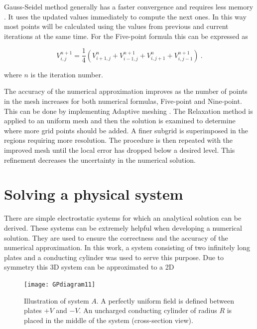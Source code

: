 \documentclass[a4paper]{jpconf}
\begin{document}
Gauss-Seidel method generally has a faster convergence and requires less memory \cite{Cheney.Kincai-NumericalMethods}. It uses the updated values immediately to compute the next ones. In this way most points will be calculated using the values from previous and current iterations at the same time. For the Five-point formula this can be expressed as

\begin{equation}
V_{i,j}^{n+1} = \frac{1}{4}(V_{i+1,j}^{n} + V_{i-1,j}^{n+1} + V_{i,j+1}^{n} + V_{i,j-1}^{n+1})~.
\end{equation}

\noindent where $n$ is the iteration number. 

The accuracy of the numerical approximation improves as the number of points in the mesh increases for both numerical formulas, Five-point and Nine-point. This can be done by implementing Adaptive meshing \cite{Press.T.V.F-NumericalRecipes}. The Relaxation method is applied to an uniform mesh and then the solution is examined to determine where more grid points should be added. A finer subgrid is superimposed in the regions requiring more resolution. The procedure is then repeated with the improved mesh until the local error has dropped below a desired level. This refinement decreases the uncertainty in the numerical solution.


\section*{Solving a physical system}
There are simple electrostatic systems for which an analytical solution can be derived. These systems can be extremely helpful when developing a numerical solution. They are used to ensure the correctness and the accuracy of the numerical approximation. In this work, a system consisting of two infinitely long plates and a conducting cylinder was used to serve this purpose. Due to symmetry this 3D system can be approximated to a 2D 



\begin{figure}[h]
	\centering
	\texttt{[image: GPdiagram11]} 
	\caption{Illustration of system $A$. A perfectly uniform field is defined between plates $+V$ and $-V$. An uncharged conducting cylinder of radius $R$ is placed in the middle of the system (cross-section view).}
	\label{fig:systemA}
\end{figure}
\end{document}
